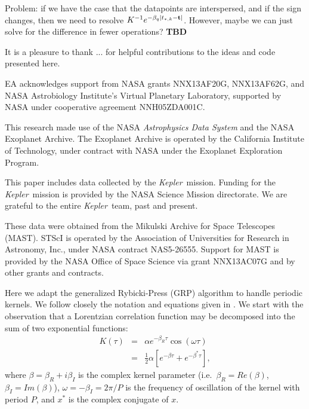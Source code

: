 \documentclass[manuscript, letterpaper]{aastex6}
\newcommand{\project}[1]{\textsl{#1}}
\newcommand{\kepler}{\project{Kepler}}
\begin{document}
Problem:  if we have the case that the datapoints are interspersed, and if the sign changes,
then we need to resolve $K^{-1} e^{-\beta_q \vert t_{*,k}-{\bf t}\vert}$.  However, maybe we can
just solve for the difference in fewer operations? {\bf TBD}

\acknowledgments
It is a pleasure to thank
...
for helpful contributions to the ideas and code presented here.

EA acknowledges support from NASA grants NNX13AF20G, NNX13AF62G, and
NASA Astrobiology Institute's Virtual Planetary Laboratory, supported
by NASA under cooperative agreement NNH05ZDA001C.

This research made use of the NASA \project{Astrophysics Data System} and the
NASA Exoplanet Archive.
The Exoplanet Archive is operated by the California Institute of Technology,
under contract with NASA under the Exoplanet Exploration Program.

This paper includes data collected by the \kepler\ mission. Funding for the
\kepler\ mission is provided by the NASA Science Mission directorate.
We are grateful to the entire \kepler\ team, past and present.

These data were obtained from the Mikulski Archive for Space Telescopes
(MAST).
STScI is operated by the Association of Universities for Research in
Astronomy, Inc., under NASA contract NAS5-26555.
Support for MAST is provided by the NASA Office of Space Science via grant
NNX13AC07G and by other grants and contracts.

\software{%
}

\appendix \label{appendixa}

Here we adapt the generalized Rybicki-Press (GRP) algorithm to handle periodic kernels.  We
follow closely the notation and equations given in \citet{Ambikasaran2015}.  We start
with the observation that a Lorentzian correlation function may be decomposed into the sum of two
exponential functions:
\begin{eqnarray}
K(\tau) &=& \alpha e^{-\beta_R \tau} \cos{(\omega \tau)}\\
 &=& \frac{1}{2}\alpha \left[e^{-\beta \tau}+e^{-\beta^* \tau}\right],
\end{eqnarray}
where $\beta = \beta_R + i\beta_I$ is the
complex kernel parameter (i.e.\ $\beta_R = Re(\beta)$, $\beta_I = Im(\beta)$), $\omega = -\beta_I = 2\pi/P$
is the frequency of oscillation of the kernel with period $P$, and $x^*$ is the complex conjugate of $x$.
\end{document}
